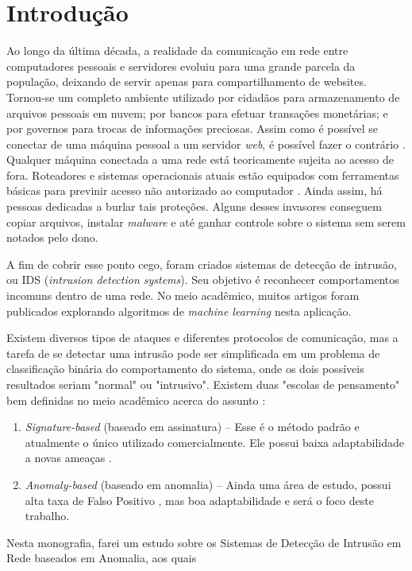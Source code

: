 \chapter{Introdução}
\label{ch:introducao}

Ao longo da última década, a realidade da comunicação em rede entre computadores pessoais e servidores evoluiu
para uma grande parcela da população, deixando de servir apenas para compartilhamento de websites.
Tornou-se um completo ambiente utilizado por cidadãos para armazenamento de arquivos pessoais em nuvem;
por bancos para efetuar transações monetárias; e por governos para trocas de informações preciosas.
Assim como é possível se conectar de uma máquina pessoal a um servidor \textit{web}, é possível fazer o contrário \cite{tsai09}.
Qualquer máquina conectada a uma rede está teoricamente sujeita ao acesso de fora.
Roteadores e sistemas operacionais atuais estão equipados com ferramentas básicas para previnir acesso não autorizado
ao computador \cite{hongjuan10}. Ainda assim, há pessoas dedicadas a burlar tais proteções. Alguns desses invasores conseguem copiar
arquivos, instalar \textit{malware} e até ganhar controle sobre o sistema sem serem notados pelo dono.
\par A fim de cobrir esse ponto cego, foram criados sistemas de detecção de intrusão, ou IDS
(\textit{intrusion detection systems}). Seu objetivo é reconhecer comportamentos incomuns dentro de uma rede.
No meio acadêmico, muitos artigos foram publicados explorando algoritmos de \emph{machine learning} nesta aplicação.
\par Existem diversos tipos de ataques e diferentes protocolos de comunicação, mas a tarefa de se detectar uma
intrusão pode ser simplificada em um problema de classificação binária do comportamento do sistema, onde os dois
possíveis resultados seriam "normal" ou "intrusivo". Existem duas "escolas de pensamento" bem definidas no meio
acadêmico acerca do assunto \cite{tsai09}:
\begin{enumerate}
    \item \textit{Signature-based} (baseado em assinatura) -- Esse é o método padrão e atualmente o único utilizado
    comercialmente. Ele possui baixa adaptabilidade a novas ameaças \cite{davis11}.
    \item \textit{Anomaly-based} (baseado em anomalia) -- Ainda uma área de estudo, possui alta taxa de
    Falso Positivo \cite{catania12}, mas boa adaptabilidade e será o foco deste trabalho.
\end{enumerate}
\par Nesta monografia, farei um estudo sobre os Sistemas de Detecção de Intrusão em Rede baseados em Anomalia, aos quais
